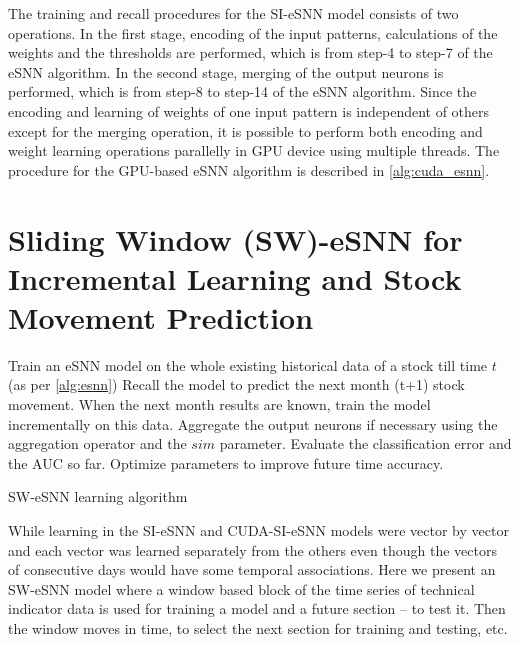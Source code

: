 The training and recall procedures for the SI-eSNN model consists of two operations. In the first stage, encoding of the input patterns, calculations of the weights and the thresholds are performed, which is from step-4 to step-7 of the eSNN algorithm. In the second stage, merging of the output neurons is performed, which is from step-8 to step-14 of the eSNN algorithm. Since the encoding and learning of weights of one input pattern is independent of others except for the merging operation, it is possible to perform both encoding and weight learning operations parallelly in GPU device using multiple threads. The procedure for the GPU-based eSNN algorithm is described in \algorithmname \ref{alg:cuda_esnn}.

\section{Sliding Window (SW)-eSNN for Incremental Learning and Stock Movement Prediction}
\label{sec:sw_esnn}
\begin{algorithm}
	\begin{algorithmic}[1]
		
		\STATE Train an eSNN model on the whole existing historical data of a stock till time $t$ (as per \algorithmname \ref{alg:esnn})
		\STATE Recall the model to predict the next month (t+1) stock movement.
		\STATE When the next month results are known, train the model incrementally on this data.
		\STATE Aggregate the output neurons if necessary using the aggregation operator and the $sim$ parameter. 
		\STATE Evaluate the classification error and the AUC so far. 
		\STATE Optimize parameters to improve future time accuracy.
	\end{algorithmic}
	\caption{SW-eSNN learning algorithm}
	\label{alg:sw_esnn}
\end{algorithm}

While learning in the SI-eSNN and CUDA-SI-eSNN models were vector by vector and each vector was learned separately from the others even though the vectors of consecutive days would have some temporal associations. Here we present an SW-eSNN model where a window based block of the time series of technical indicator data is used for training a model and a future section – to test it. Then the window moves in time, to select the next section for training and testing, etc. 


